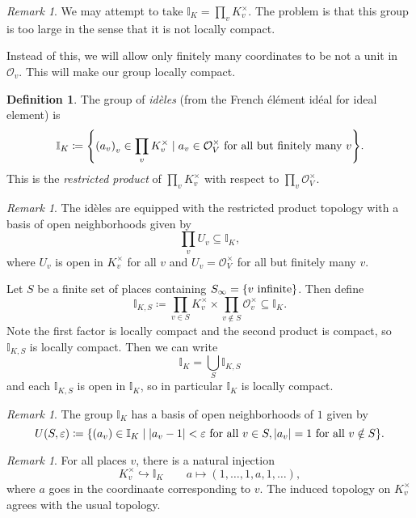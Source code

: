\documentclass[leqno, openany]{memoir}
\theoremstyle{definition}
\newtheorem{defn}[thm]{Definition}
\theoremstyle{remark}
\newtheorem{rmk}[thm]{Remark}
\theoremstyle{plain}
\theoremstyle{definition}
\theoremstyle{remark}
\newcommand{\I}{\mathbb{I}}
\newcommand{\ep}{\varepsilon}
\newcommand{\mc}[1]{\mathcal{#1}}
\begin{document}
\begin{rmk}
    We may attempt to take $\I_K = \prod_v K_v^{\times}$. The problem is that this group is too large in the sense that it is not locally compact.
\end{rmk}

Instead of this, we will allow only finitely many coordinates to be not a unit in $\mc{O}_v$. This will make our group locally compact.

\begin{defn}
    The group of \textit{id\`eles} (from the French \'el\'ement id\'eal for ideal element) is
    \[ \I_K \coloneqq \qty{{(a_v)}_v \in \prod_v K_v^{\times} \mid a_v \in \mc{O}_V^{\times} \text{ for all but finitely many }v}. \]
    This is the \textit{restricted product} of $\prod_v K_v^{\times}$ with respect to $\prod_v \mc{O}_V^{\times}$.
\end{defn}

\begin{rmk}
    The id\`eles are equipped with the restricted product topology with a basis of open neighborhoods given by
    \[ \prod_v U_v \subseteq \I_K, \]
    where $U_v$ is open in $K_v^{\times}$ for all $v$ and $U_v = \mc{O}_V^{\times}$ for all but finitely many $v$.
\end{rmk}

Let $S$ be a finite set of places containing $S_{\infty} = \qty{v\ \text{infinite}}$. Then define
\[ \I_{K,S} \coloneqq \prod_{v \in S} K_v^{\times} \times \prod_{v \notin S} \mc{O}_v^{\times} \subseteq \I_K. \]
Note the first factor is locally compact and the second product is compact, so $\I_{K,S}$ is locally compact. Then we can write
\[ \I_K = \bigcup_S \I_{K,S} \]
and each $\I_{K,S}$ is open in $\I_K$, so in particular $\I_K$ is locally compact.

\begin{rmk}
    The group $\I_K$ has a basis of open neighborhoods of $1$ given by
    \[ U(S, \ep) \coloneqq \qty{(a_v) \in \I_K \mid \abs{a_v - 1} < \ep \text{ for all } v \in S, \abs{a_v} = 1 \text{ for all } v \notin S}. \]
\end{rmk}

\begin{rmk}
    For all places $v$, there is a natural injection 
    \[ K_v^{\times} \hookrightarrow \I_K \qquad a \mapsto (1, \ldots, 1, a, 1, \ldots), \]
    where $a$ goes in the coordinaate corresponding to $v$. The induced topology on $K_v^{\times}$ agrees with the usual topology.
\end{rmk}
\end{document}
